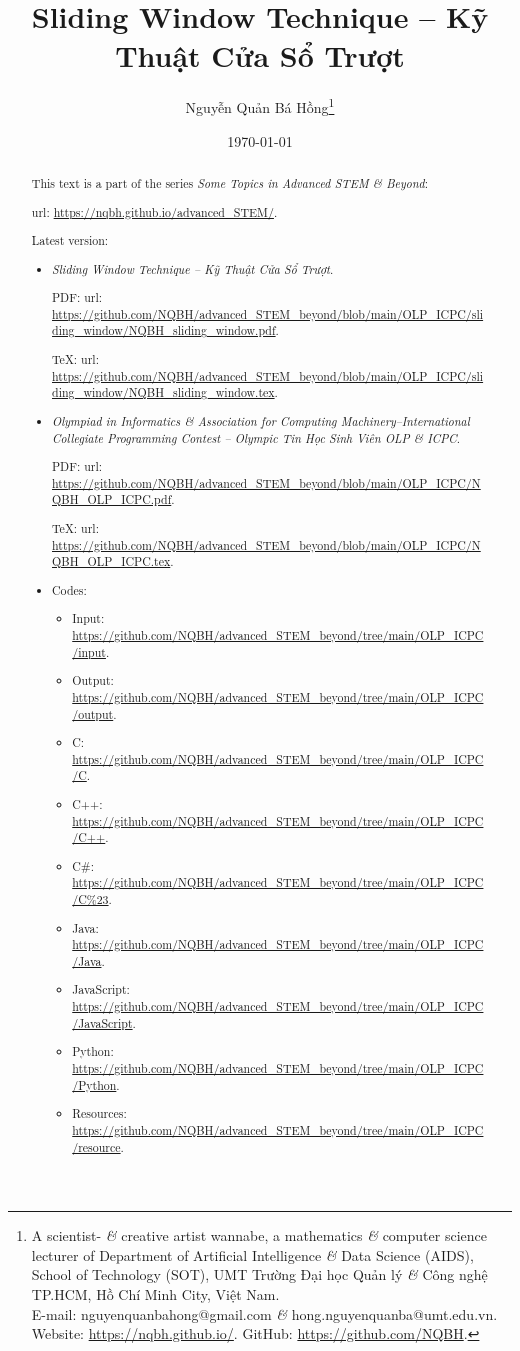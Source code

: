 \documentclass{article}
\title{Sliding Window Technique -- Kỹ Thuật Cửa Sổ Trượt}
\author{Nguyễn Quản Bá Hồng\footnote{A scientist- {\it\&} creative artist wannabe, a mathematics {\it\&} computer science lecturer of Department of Artificial Intelligence {\it\&} Data Science (AIDS), School of Technology (SOT), UMT Trường Đại học Quản lý {\it\&} Công nghệ TP.HCM, Hồ Chí Minh City, Việt Nam.\\E-mail: {\sf nguyenquanbahong@gmail.com} {\it\&} {\sf hong.nguyenquanba@umt.edu.vn}. Website: \url{https://nqbh.github.io/}. GitHub: \url{https://github.com/NQBH}.}}
\date{\today}
\begin{document}
\maketitle
\begin{abstract}
    This text is a part of the series {\it Some Topics in Advanced STEM \& Beyond}:

    {\sc url}: \url{https://nqbh.github.io/advanced_STEM/}.

    Latest version:
    \begin{itemize}
        \item {\it Sliding Window Technique -- Kỹ Thuật Cửa Sổ Trượt}.

        PDF: {\sc url}: \url{https://github.com/NQBH/advanced_STEM_beyond/blob/main/OLP_ICPC/sliding_window/NQBH_sliding_window.pdf}.

        \TeX: {\sc url}: \url{https://github.com/NQBH/advanced_STEM_beyond/blob/main/OLP_ICPC/sliding_window/NQBH_sliding_window.tex}.
        \item {\it Olympiad in Informatics \& Association for Computing Machinery--International Collegiate Programming Contest -- Olympic Tin Học Sinh Viên OLP \& ICPC}.

        PDF: {\sc url}: \url{https://github.com/NQBH/advanced_STEM_beyond/blob/main/OLP_ICPC/NQBH_OLP_ICPC.pdf}.

        \TeX: {\sc url}: \url{https://github.com/NQBH/advanced_STEM_beyond/blob/main/OLP_ICPC/NQBH_OLP_ICPC.tex}.
        \item Codes:
        \begin{itemize}
            \item Input: \url{https://github.com/NQBH/advanced_STEM_beyond/tree/main/OLP_ICPC/input}.
            \item Output: \url{https://github.com/NQBH/advanced_STEM_beyond/tree/main/OLP_ICPC/output}.
            \item C: \url{https://github.com/NQBH/advanced_STEM_beyond/tree/main/OLP_ICPC/C}.
            \item C++: \url{https://github.com/NQBH/advanced_STEM_beyond/tree/main/OLP_ICPC/C++}.
            \item C\#: \url{https://github.com/NQBH/advanced_STEM_beyond/tree/main/OLP_ICPC/C%23}.
            \item Java: \url{https://github.com/NQBH/advanced_STEM_beyond/tree/main/OLP_ICPC/Java}.
            \item JavaScript: \url{https://github.com/NQBH/advanced_STEM_beyond/tree/main/OLP_ICPC/JavaScript}.
            \item Python: \url{https://github.com/NQBH/advanced_STEM_beyond/tree/main/OLP_ICPC/Python}.
            \item Resources: \url{https://github.com/NQBH/advanced_STEM_beyond/tree/main/OLP_ICPC/resource}.
        \end{itemize}
    \end{itemize}
\end{abstract}
\tableofcontents
\end{document}
